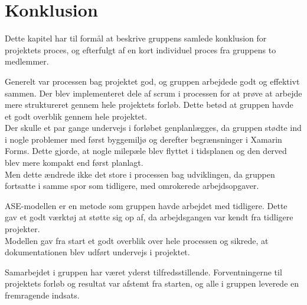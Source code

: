 \chapter{Konklusion}
Dette kapitel har til formål at beskrive gruppens samlede konklusion for projektets proces, og efterfulgt af en kort individuel proces fra gruppens to medlemmer. 

Generelt var processen bag projektet god, og gruppen arbejdede godt og effektivt sammen.
Der blev implementeret dele af scrum i processen for at prøve at arbejde mere struktureret gennem hele projektets forløb. Dette betød at gruppen havde et godt overblik gennem hele projektet. \\
Der skulle et par gange undervejs i forløbet genplanlægges, da gruppen stødte ind i nogle problemer med først byggemiljø og derefter begrænsninger i Xamarin Forms. Dette gjorde, at nogle milepæle blev flyttet i tidsplanen og den derved blev mere kompakt end først planlagt. \\
Men dette ændrede ikke det store i processen bag udviklingen, da gruppen fortsatte i samme spor som tidligere, med omrokerede arbejdsopgaver.

ASE-modellen er en metode som gruppen havde arbejdet med tidligere. Dette gav et godt værktøj at støtte sig op af, da arbejdsgangen var kendt fra tidligere projekter. \\
Modellen gav fra start et godt overblik over hele processen og sikrede, at dokumentationen blev udført undervejs i projektet.

Samarbejdet i gruppen har været yderst tilfredsstillende. Forventningerne til projektets forløb og resultat var afstemt fra starten, og alle i gruppen leverede en fremragende indsats.

%
%